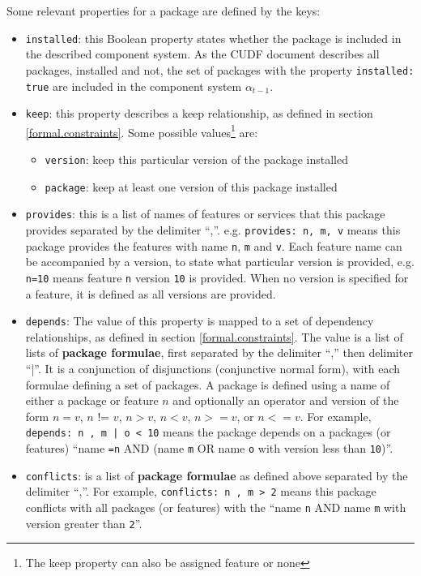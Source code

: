 Some relevant properties for a package are defined by the keys:
\begin{itemize}
  \item \verb+installed+: this Boolean property states whether the package is included in the described component system. 
  As the CUDF document describes all packages, installed and not, the set of packages with the property \verb+installed: true+ are included in the component system $\alpha_{t-1}$.
  \item \verb+keep+: this property describes a keep relationship, as defined in section \ref{formal.constraints}.
  Some possible values\footnote{The keep property can also be assigned feature or none} are:
	  	\begin{itemize}
	  		\item \verb+version+: keep this particular version of the package installed
	  		\item \verb+package+: keep at least one version of this package installed
		\end{itemize}
  \item \verb+provides+: this is a list of names of features or services that this package provides separated by the delimiter ``,''.
  e.g. \verb+provides: n, m, v+ means this package provides the features with name \verb+n+, \verb+m+ and \verb+v+.
  Each feature name can be accompanied by a version, to state what particular version is provided, e.g. \verb+n=10+ means feature \verb+n+ version \verb+10+ is provided.
  When no version is specified for a feature, it is defined as all versions are provided.
  \item \verb+depends+: The value of this property is mapped to a set of dependency relationships, as defined in section \ref{formal.constraints}.
  The value is a list of lists of \textbf{package formulae}, first separated by the delimiter ``,'' then delimiter ``|''.
  It is a conjunction of disjunctions (conjunctive normal form), with each formulae defining a set of packages.
  A package is defined using a name of either a package or feature $n$ and optionally an operator and version of the form  $n = v$, $n$ != $v$, $n > v$, $n < v$, $n >= v$, or $n <= v$.
  For example, \verb+depends: n , m | o < 10+ means the package depends on a packages (or features) ``name \verb+=n+ AND (name \verb+m+ OR name \verb+o+ with version less than \verb+10+)''.  
  \item \verb+conflicts+: is a list of \textbf{package formulae} as defined above separated by the delimiter ``,''.
  For example, \verb+conflicts: n , m > 2+ means this package conflicts with all packages (or features) with the ``name \verb+n+ AND name \verb+m+ with version greater than \verb+2+''.
\end{itemize}

